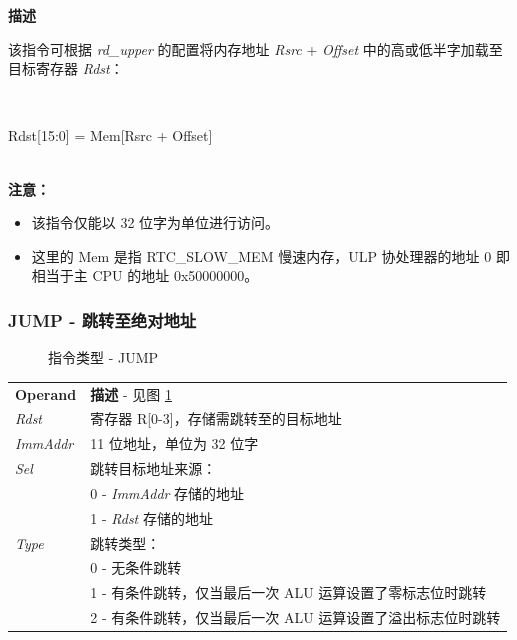 \documentclass[main\_\_CN.tex]{subfiles}
\begin{document}
\textbf{描述}

该指令可根据 \textit{rd\_upper} 的配置将内存地址 \textit{Rsrc} + \textit{Offset} 中的高或低半字加载至目标寄存器 \textit{Rdst}：

~
\begin{centering}
    Rdst[15:0] = Mem[Rsrc + Offset] \\
\end{centering}
~\\

\vspace{-2em}
\textbf{注意：}
\begin{itemize}
    \item 该指令仅能以 32 位字为单位进行访问。
    \item 这里的 Mem 是指 RTC\_SLOW\_MEM 慢速内存，ULP 协处理器的地址 0 即相当于主 CPU 的地址 0x{}50000000。
\end{itemize}


\subsubsection{JUMP - 跳转至绝对地址} \label{para:JUMP}

%
%
%
%
%
%
%
%
\begin{figure}[H]
    \centering
    \caption{指令类型 - JUMP}
    \label{fig:JUMP}
\end{figure}

\vspace{-2em}
\begin{tabular}{ l l }
\textbf{Operand} & \textbf{描述} - 见图 \ref{fig:JUMP} \\
\textit{Rdst} & 寄存器 R[0-3]，存储需跳转至的目标地址 \\
\textit{ImmAddr} & 11 位地址，单位为 32 位字\\
\textit{Sel} & 跳转目标地址来源： \\
 & 0 - \textit{ImmAddr} 存储的地址\\
 & 1 - \textit{Rdst} 存储的地址 \\
\textit{Type} & 跳转类型： \\
 & 0 - 无条件跳转 \\
 & 1 - 有条件跳转，仅当最后一次 ALU 运算设置了零标志位时跳转 \\
 & 2 - 有条件跳转，仅当最后一次 ALU 运算设置了溢出标志位时跳转
\end{tabular}
\end{document}
